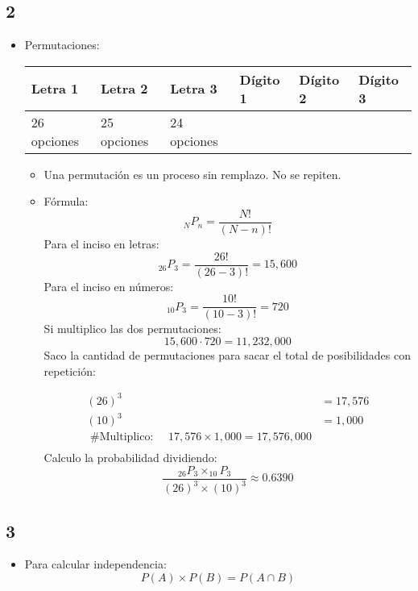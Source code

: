 \subsection{2}
\begin{itemize}
    \item Permutaciones: 
        \begin{center}
           \begin{tabular}{ | p{5cm} | p{5cm} | p{5cm} |  p{5cm} |  p{5cm} | p{5cm} |}
               \hline
                    Letra 1 & Letra 2 & Letra 3             & Dígito 1 &  Dígito 2 & Dígito 3 \\
               \hline
                    26 opciones & 25 opciones & 24 opciones &  
               \hline
           \end{tabular}
           \begin{itemize}[label=\#]
               \item Una permutación es un proceso sin remplazo. No se repiten.
               \item Fórmula:
                    \[
                      _NP_n = \frac{N!}{(N-n)!} 
                    \]
                    Para el inciso en letras:
                    \[
                        _{26}P_3 = \frac{26!}{(26-3)!} = 15,600
                    \]
                    Para el inciso en números:
                    \[
                      _{10}P_3= \frac{10!}{(10-3)!} = 720 
                    \]
                    Si multiplico las dos permutaciones:
                    \[
                      15,600\cdot720 = 11,232,000 
                    \]
                    Saco la cantidad de permutaciones para sacar el total de posibilidades con repetición: 
                    \begin{center}
                       \begin{align*}
                           (26)^3 &= 17,576 \\ 
                           (10)^3 &= 1,000 \\ 
                           \text{  \# Multiplico:  } \quad 17,576 \times 1,000 = 17,576,000 \\ 
                       \end{align*}
                    Calculo la probabilidad dividiendo:
                    \[
                      \frac{_{26}P_3 \times _{10}P_3}{(26)^3\times(10)^3} \approx 0.6390
                    \]
                    \end{center}
           \end{itemize}
        \end{center}
\end{itemize}



\subsection{3}
\begin{itemize}
    \item Para calcular independencia:
        \[
          P(A) \times P(B) = P(A\cap B)
        \]
\end{itemize}
